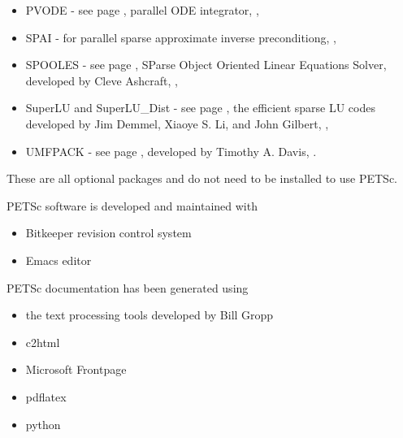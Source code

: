 \begin{itemize}
                     ,
  \item PVODE -       see page \pageref{sec_pvode}, parallel ODE integrator,
                     ,
  \item SPAI -        for parallel sparse approximate inverse preconditiong, 
                     ,
  \item SPOOLES - see page \pageref{sec_externalsol}, SParse Object Oriented Linear Equations Solver, developed by Cleve Ashcraft, 
                    ,
  \item SuperLU and SuperLU\_Dist - see page \pageref{sec_externalsol}, 
                    the efficient sparse LU codes developed by Jim Demmel,  Xiaoye S. Li, and John Gilbert, 
                    ,
  \item UMFPACK - see page \pageref{sec_externalsol}, 
                    developed by Timothy A. Davis, 
                    .
\end{itemize}
These are all optional packages and do not need to be installed to use PETSc.

PETSc software is developed and maintained with 
\begin{itemize}
\item Bitkeeper revision control system
\item Emacs editor
\end{itemize}

PETSc documentation has been generated using
\begin{itemize}
\item the text processing tools developed by Bill Gropp
\item c2html
\item Microsoft Frontpage
\item pdflatex
\item python
\end{itemize}

